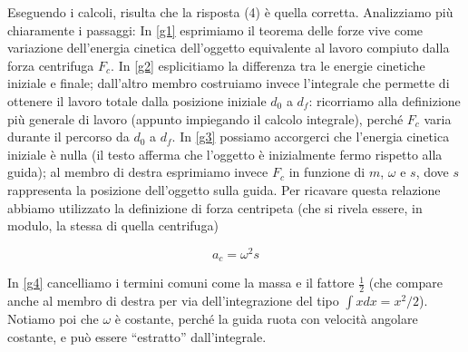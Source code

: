 \noindent Eseguendo i calcoli, risulta che la risposta
(4) è quella corretta. Analizziamo più chiaramente i passaggi:
In \ref{g1} esprimiamo il teorema delle forze vive
come variazione dell'energia cinetica dell'oggetto
equivalente al lavoro compiuto dalla forza centrifuga $F_c$.
In \ref{g2} esplicitiamo la differenza tra le energie
cinetiche iniziale e finale; dall'altro membro costruiamo
invece l'integrale che permette di ottenere il lavoro
totale dalla posizione iniziale $d_0$ a $d_f$: ricorriamo
alla definizione più generale di lavoro (appunto impiegando
il calcolo integrale), perché $F_c$ varia durante il
percorso da $d_0$ a $d_f$. In \ref{g3} possiamo accorgerci
che l'energia cinetica iniziale è nulla (il testo afferma
che l'oggetto è inizialmente fermo rispetto alla guida);
al membro di destra esprimiamo invece $F_c$ in funzione
di $m$, $\omega$ e $s$, dove $s$ rappresenta la posizione
dell'oggetto sulla guida. Per ricavare questa relazione
abbiamo utilizzato la definizione di forza centripeta
(che si rivela essere, in modulo, la stessa di quella
centrifuga)

\[ a_c = \omega^2 s \]

\noindent In \ref{g4} cancelliamo i termini comuni
come la massa e il fattore $\frac12$ (che compare
anche al membro di destra per via dell'integrazione
del tipo $\int xdx = x^2/2$). Notiamo poi che $\omega$
è costante, perché la guida ruota con velocità angolare
costante, e può essere ``estratto'' dall'integrale.